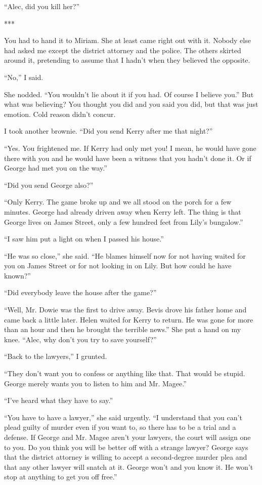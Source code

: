 \documentclass{novel}
\begin{document}
“Alec, did you kill her?”

***

You had to hand it to Miriam. She at least came right out with it. Nobody else had asked me except the district attorney and the police. The others skirted around it, pretending to assume that I hadn’t when they believed the opposite.

“No,” I said.

She nodded. “You wouldn’t lie about it if you had. Of course I believe you.” But what was believing? You thought you did and you said you did, but that was just emotion. Cold reason didn’t concur.

I took another brownie. “Did you send Kerry after me that night?”

“Yes. You frightened me. If Kerry had only met you! I mean, he would have gone there with you and he would have been a witness that you hadn’t done it. Or if George had met you on the way.”

“Did you send George also?”

“Only Kerry. The game broke up and we all stood on the porch for a few minutes. George had already driven away when Kerry left. The thing is that George lives on James Street, only a few hundred feet from Lily’s bungalow.”

“I saw him put a light on when I passed his house.”

“He was so close,” she said. “He blames himself now for not having waited for you on James Street or for not looking in on Lily. But how could he have known?”

“Did everybody leave the house after the game?”

“Well, Mr. Dowie was the first to drive away. Bevis drove his father home and came back a little later. Helen waited for Kerry to return. He was gone for more than an hour and then he brought the terrible news.” She put a hand on my knee. “Alec, why don’t you try to save yourself?”

“Back to the lawyers,” I grunted.

“They don’t want you to confess or anything like that. That would be stupid. George merely wants you to listen to him and Mr. Magee.”

“I’ve heard what they have to say.”

“You have to have a lawyer,” she said urgently. “I understand that you can’t plead guilty of murder even if you want to, so there has to be a trial and a defense. If George and Mr. Magee aren’t your lawyers, the court will assign one to you. Do you think you will be better off with a strange lawyer? George says that the district attorney is willing to accept a second-degree murder plea and that any other lawyer will snatch at it. George won’t and you know it. He won’t stop at anything to get you off free.”
\end{document}
